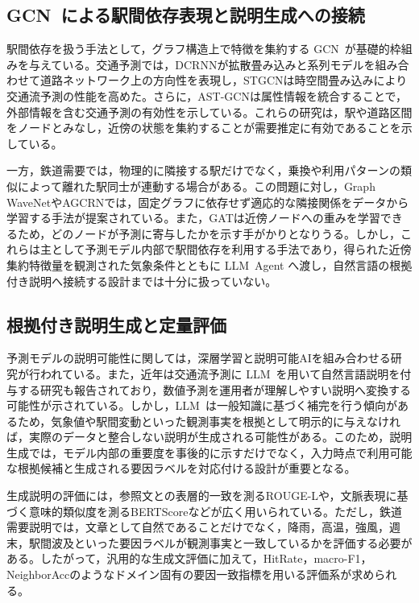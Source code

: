 \documentclass[technicalreport]{ieicej}
\newcommand{\LLM}{LLM}
\newcommand{\GCN}{GCN}
\begin{document}
\subsection{\GCN\ による駅間依存表現と説明生成への接続}
駅間依存を扱う手法として，グラフ構造上で特徴を集約する \GCN\ が基礎的枠組みを与えている\cite{kipf2016semi,defferrard2016convolutional}。交通予測では，DCRNNが拡散畳み込みと系列モデルを組み合わせて道路ネットワーク上の方向性を表現し\cite{li2017diffusion}，STGCNは時空間畳み込みにより交通流予測の性能を高めた\cite{10.5555/3304222.3304273}。さらに，AST-GCNは属性情報を統合することで，外部情報を含む交通予測の有効性を示している\cite{9363197}。これらの研究は，駅や道路区間をノードとみなし，近傍の状態を集約することが需要推定に有効であることを示している。

一方，鉄道需要では，物理的に隣接する駅だけでなく，乗換や利用パターンの類似によって離れた駅同士が連動する場合がある。この問題に対し，Graph WaveNetやAGCRNでは，固定グラフに依存せず適応的な隣接関係をデータから学習する手法が提案されている\cite{wu2019graph,bai2020adaptive}。また，GATは近傍ノードへの重みを学習できるため\cite{velickovic2017graph}，どのノードが予測に寄与したかを示す手がかりとなりうる。しかし，これらは主として予測モデル内部で駅間依存を利用する手法であり，得られた近傍集約特徴量を観測された気象条件とともに \LLM\ Agent へ渡し，自然言語の根拠付き説明へ接続する設計までは十分に扱っていない。

\subsection{根拠付き説明生成と定量評価}
予測モデルの説明可能性に関しては，深層学習と説明可能AIを組み合わせる研究が行われている\cite{monje2022deep}。また，近年は交通流予測に \LLM\ を用いて自然言語説明を付与する研究も報告されており\cite{guo2024towards}，数値予測を運用者が理解しやすい説明へ変換する可能性が示されている。しかし，\LLM\ は一般知識に基づく補完を行う傾向があるため，気象値や駅間変動といった観測事実を根拠として明示的に与えなければ，実際のデータと整合しない説明が生成される可能性がある。このため，説明生成では，モデル内部の重要度を事後的に示すだけでなく，入力時点で利用可能な根拠候補と生成される要因ラベルを対応付ける設計が重要となる。

生成説明の評価には，参照文との表層的一致を測るROUGE-L\cite{lin2004rouge}や，文脈表現に基づく意味的類似度を測るBERTScore\cite{scorato2023bertscore}などが広く用いられている。ただし，鉄道需要説明では，文章として自然であることだけでなく，降雨，高温，強風，週末，駅間波及といった要因ラベルが観測事実と一致しているかを評価する必要がある。したがって，汎用的な生成文評価に加えて，HitRate，macro-F1，NeighborAccのようなドメイン固有の要因一致指標を用いる評価系が求められる。
\end{document}
